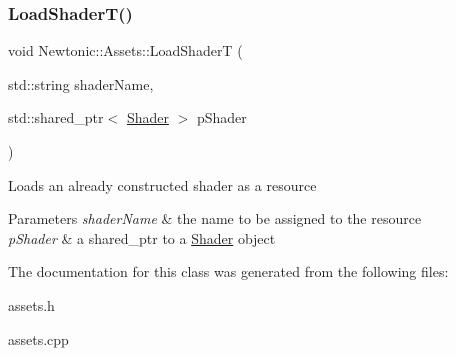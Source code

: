 \subsubsection{\texorpdfstring{LoadShaderT()}{LoadShaderT()}}
{\footnotesize\ttfamily void Newtonic\+::\+Assets\+::\+Load\+ShaderT (\begin{DoxyParamCaption}\item[{std\+::string}]{shader\+Name,  }\item[{std\+::shared\+\_\+ptr$<$ \mbox{\hyperlink{classNewtonic_1_1Shader}{Shader}} $>$}]{p\+Shader }\end{DoxyParamCaption})}

Loads an already constructed shader as a resource 
\begin{DoxyParams}{Parameters}
{\em shader\+Name} & the name to be assigned to the resource \\
\hline
{\em p\+Shader} & a shared\+\_\+ptr to a \mbox{\hyperlink{classNewtonic_1_1Shader}{Shader}} object \\
\hline
\end{DoxyParams}


The documentation for this class was generated from the following files\+:\begin{DoxyCompactItemize}
\item 
assets.\+h\item 
assets.\+cpp\end{DoxyCompactItemize}
